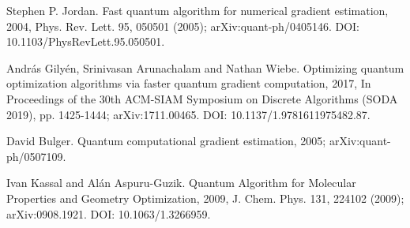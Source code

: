 \documentclass{article}
\begin{document}
%
%
\begin{thebibliography}{5}

  Stephen P. Jordan.
  \newblock Fast quantum algorithm for numerical gradient estimation, 2004,
  \newblock Phys. Rev. Lett. 95, 050501 (2005);
  \newblock arXiv:quant-ph/0405146.
  \newblock DOI: 10.1103/PhysRevLett.95.050501.

  András Gilyén, Srinivasan Arunachalam and Nathan Wiebe.
  \newblock Optimizing quantum optimization algorithms via faster quantum gradient computation, 2017,
  \newblock In Proceedings of the 30th ACM-SIAM Symposium on Discrete
  Algorithms (SODA 2019), pp. 1425-1444;
  \newblock arXiv:1711.00465.
  \newblock DOI: 10.1137/1.9781611975482.87.


  David Bulger.
  \newblock Quantum computational gradient estimation, 2005;
  \newblock arXiv:quant-ph/0507109.

  Ivan Kassal and Alán Aspuru-Guzik.
  \newblock Quantum Algorithm for Molecular Properties and Geometry Optimization, 2009,
  \newblock J. Chem. Phys. 131, 224102 (2009);
  \newblock arXiv:0908.1921.
  \newblock DOI: 10.1063/1.3266959.


\end{thebibliography}
\end{document}
